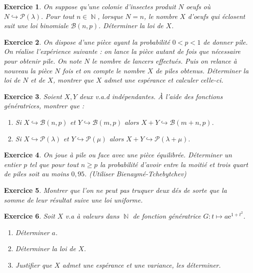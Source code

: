 \documentclass[12pt,a4paper]{article}
\DeclareMathOperator{\N}{\mathbb{N}}
\newtheorem{Exo}{Exercice}
\begin{document}
 \begin{Exo}
 	On suppose qu’une colonie d’insectes produit $N$ oeufs où $N\hookrightarrow\mathcal{P}(\lambda)$. Pour tout $n\in\N$, lorsque $N=n$, le nombre $X$ d’oeufs qui éclosent suit une loi binomiale $\mathcal{B}(n,p)$. Déterminer la loi de $X$.
 \end{Exo}
 
 
 
\begin{Exo}
	On dispose d’une pièce ayant la probabilité $0<p<1$ de donner pile.
On  réalise l’expérience suivante : on lance la pièce autant de fois que nécessaire pour obtenir pile. On note $N$ le nombre de lancers effectués. Puis on relance à nouveau la pièce $N$ fois et on compte le nombre $X$ de piles obtenus. Déterminer la loi de $N$ et de $X$, montrer que $X$ admet une espérance et calculer celle-ci.
\end{Exo}


\begin{Exo}
	Soient $X,Y$ deux v.a.d indépendantes. À l’aide des fonctions génératrices, montrer que :
\begin{enumerate}
	\item
	Si $X\hookrightarrow \mathcal{B}(n,p)$ et $Y\hookrightarrow \mathcal{B}(m,p)$ alors  $X+Y\hookrightarrow \mathcal{B}(m+n,p)$.
	\item
	Si $X\hookrightarrow \mathcal{P}(\lambda)$ et $Y\hookrightarrow \mathcal{P}(\mu)$ alors  $X+Y\hookrightarrow \mathcal{P}(\lambda+\mu)$.
\end{enumerate}
\end{Exo}


\begin{Exo}
	On joue à pile ou face avec une pièce équilibrée.  Déterminer un entier $p$ tel
que pour tout $n\geqslant p$ la probabilité d'avoir entre la moitié et trois quart de piles soit au moins $0,95$. (Utiliser Bienaymé-Tchebytchev)
\end{Exo}



\begin{Exo}
	Montrer que l'on ne peut pas truquer deux dés de sorte que la somme de leur résultat suive une loi uniforme.
\end{Exo}


\begin{Exo}
	Soit $X$ v.a à valeurs dans $\N$ de fonction génératrice $G:t\mapsto a\mathrm{e}^{1+t^2}$.
\begin{enumerate}
	\item
	Déterminer $a$.
	\item
	Déterminer la loi de $X$.
	\item Justifier que $X$ admet une espérance et une variance, les déterminer.
\end{enumerate}
\end{Exo}
\end{document}

